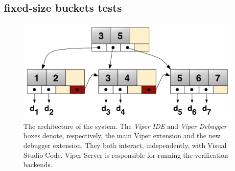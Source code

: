 \subsection{fixed-size buckets tests}\label{sec:fixed-size buckets-tests}
\begin{figure}[htb]
  \centering
  \includegraphics[width=\textwidth,height=\textheight,keepaspectratio]{img/b+tree.png}
  \caption[The architecture of the system]{ The architecture of the system. The
    \textit{Viper IDE} and \textit{Viper Debugger} boxes denote, respectively,
    the main Viper extension and the new debugger extension. They both interact,
    independently, with Visual Studio Code. Viper Server is responsible for
    running the verification backends.}
  \label{fig:b+tree}
\end{figure}
